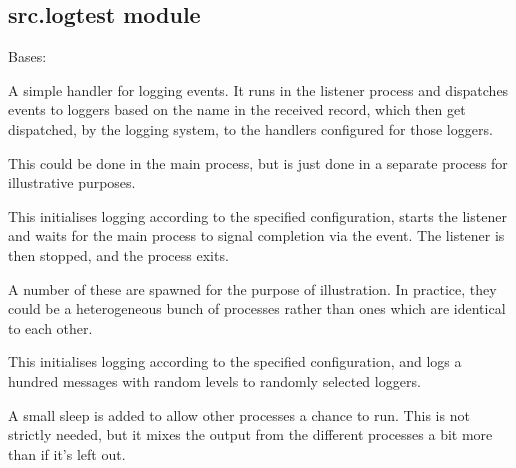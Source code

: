 \documentclass[letterpaper,10pt,english]{sphinxmanual}
\begin{document}
\subsection{src.logtest module}
\label{\detokenize{src:module-src.logtest}}\label{\detokenize{src:src-logtest-module}}

\begin{fulllineitems}
\label{\detokenize{src:src.logtest.MyHandler}}
Bases: 

A simple handler for logging events. It runs in the listener process and
dispatches events to loggers based on the name in the received record,
which then get dispatched, by the logging system, to the handlers
configured for those loggers.

\end{fulllineitems}


\begin{fulllineitems}
\label{\detokenize{src:src.logtest.listener_process}}
This could be done in the main process, but is just done in a separate
process for illustrative purposes.

This initialises logging according to the specified configuration,
starts the listener and waits for the main process to signal completion
via the event. The listener is then stopped, and the process exits.

\end{fulllineitems}


\begin{fulllineitems}
\label{\detokenize{src:src.logtest.worker_process}}
A number of these are spawned for the purpose of illustration. In
practice, they could be a heterogeneous bunch of processes rather than
ones which are identical to each other.

This initialises logging according to the specified configuration,
and logs a hundred messages with random levels to randomly selected
loggers.

A small sleep is added to allow other processes a chance to run. This
is not strictly needed, but it mixes the output from the different
processes a bit more than if it’s left out.

\end{fulllineitems}
\end{document}
